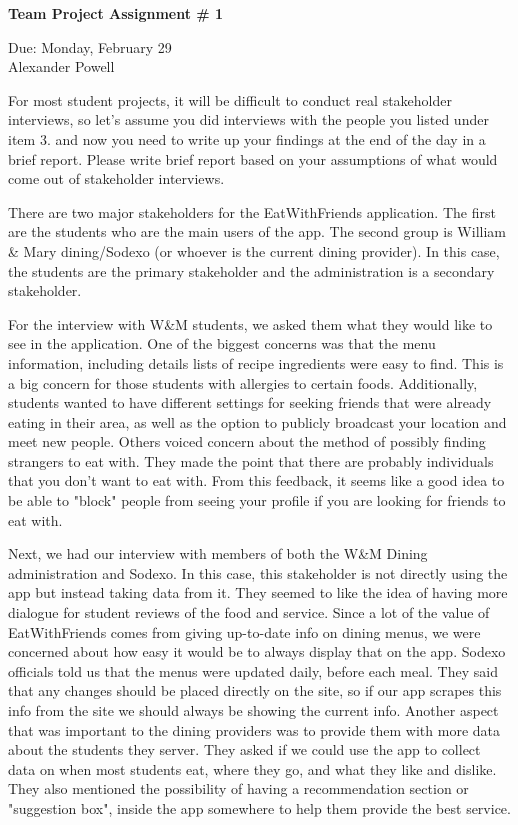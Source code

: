 \documentclass[11pt]{article}
\begin{document}
\begin{center}             %
\begin{LARGE}
{\bf Team Project Assignment \# 1}
\end{LARGE}
\vskip 0.25cm      %

Due: Monday, February 29 \\  %
Alexander Powell
\end{center}




\item For most student projects, it will be difficult to conduct real stakeholder interviews, so let’s 
assume you did interviews with the people you listed under item 3. and now you need to 
write up your findings at the end of the day in a brief report. Please write brief report based 
on your assumptions of what would come out of stakeholder interviews. 

There are two major stakeholders for the EatWithFriends application.  The first are the students who are the main users of the app.  The second group is William & Mary dining/Sodexo (or whoever is the current dining provider).  In this case, the students are the primary stakeholder and the administration is a secondary stakeholder.  

For the interview with W&M students, we asked them what they would like to see in the application.  One of the biggest concerns was that the menu information, including details lists of recipe ingredients were easy to find.  This is a big concern for those students with allergies to certain foods.  Additionally, students wanted to have different settings for seeking friends that were already eating in their area, as well as the option to publicly broadcast your location and meet new people.  Others voiced concern about the method of possibly finding strangers to eat with.  They made the point that there are probably individuals that you don't want to eat with.  From this feedback, it seems like a good idea to be able to "block" people from seeing your profile if you are looking for friends to eat with.  

Next, we had our interview with members of both the W&M Dining administration and Sodexo.  In this case, this stakeholder is not directly using the app but instead taking data from it.  They seemed to like the idea of having more dialogue for student reviews of the food and service.  Since a lot of the value of EatWithFriends comes from giving up-to-date info on dining menus, we were concerned about how easy it would be to always display that on the app.  Sodexo officials told us that the menus were updated daily, before each meal.  They said that any changes should be placed directly on the site, so if our app scrapes this info from the site we should always be showing the current info.  Another aspect that was important to the dining providers was to provide them with more data about the students they server.  They asked if we could use the app to collect data on when most students eat, where they go, and what they like and dislike.  They also mentioned the possibility of having a recommendation section or "suggestion box", inside the app somewhere to help them provide the best service.  
\end{document}

